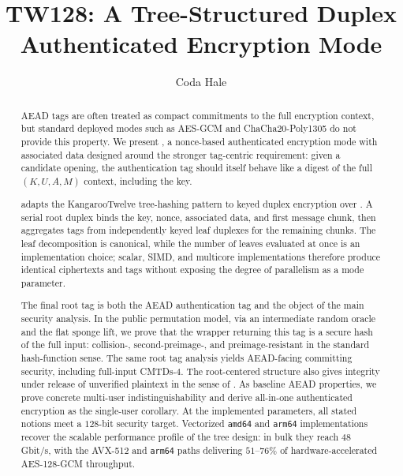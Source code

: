 \documentclass[journal=tosc,submission,notanonymous]{iacrtrans}
\title[TW128]{TW128: A Tree-Structured Duplex Authenticated Encryption Mode}
\author{Coda Hale}
\institute{Hale Institute for Bicycle Appreciation}
\begin{document}
\maketitle


\begin{abstract}
  AEAD tags are often treated as compact commitments to the full encryption
  context, but standard deployed modes such as AES-GCM and
  ChaCha20-Poly1305 do not provide this property. We present \TW{}, a
  nonce-based authenticated encryption mode with associated data designed around
  the stronger tag-centric requirement: given a candidate opening, the
  authentication tag should itself behave like a digest of the full
  $(K, U, A, M)$ context, including the key.

  \TW{} adapts the KangarooTwelve tree-hashing pattern to keyed duplex
  encryption over \Keccakp{}. A serial root duplex binds the key, nonce,
  associated data, and first message chunk, then aggregates tags from
  independently keyed leaf duplexes for the remaining chunks. The leaf
  decomposition is canonical, while the number of leaves evaluated at once is an
  implementation choice; scalar, SIMD, and multicore implementations therefore
  produce identical ciphertexts and tags without exposing the degree of
  parallelism as a mode parameter.

  The final root tag is both the AEAD authentication tag and the object of the
  main security analysis. In the public permutation model, via an intermediate
  random oracle and the flat sponge lift, we prove that the wrapper returning
  this tag is a secure hash of the full input: collision-, second-preimage-, and
  preimage-resistant in the standard hash-function sense. The same root tag
  analysis yields AEAD-facing committing security, including full-input
  \textsf{CMTDs-4}. The root-centered structure also gives integrity under
  release of unverified plaintext in the sense of \cite{ABLMMY14}. As baseline
  AEAD properties, we prove concrete multi-user indistinguishability and derive
  all-in-one authenticated encryption as the single-user corollary. At the
  implemented parameters, all stated notions meet a $128$-bit security target.
  Vectorized \texttt{amd64} and \texttt{arm64} implementations recover the
  scalable performance profile of the tree design: in bulk they reach
  $48$\,Gbit/s, with the AVX-512 and \texttt{arm64} paths delivering
  $51$--$76\%$ of hardware-accelerated AES-128-GCM throughput.
\end{abstract}
\end{document}
